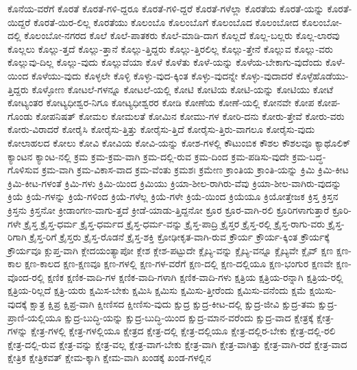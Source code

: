 {ಕೊನೆಯ-ವರೆಗೆ
ಕೊರತೆ
ಕೊರತೆ-ಗಳಿ-ದ್ದರೂ
ಕೊರತೆ-ಗಳಿ-ದ್ದರೆ
ಕೊರತೆ-ಗಳೆಲ್ಲಾ
ಕೊರತೆಯ
ಕೊರತೆ-ಯನ್ನು
ಕೊರತೆ-ಯಿದ್ದರೆ
ಕೊರತೆ-ಯಿರ-ಲಿಲ್ಲ
ಕೊರತೆಯು
ಕೊಲಂಬೊ
ಕೊಲಂಬೊಗೆ
ಕೊಲಂಬೊದ
ಕೊಲಂಬೋದ
ಕೊಲಂಬೋ-ದಲ್ಲಿ
ಕೊಲಂಬೋ-ನಗರದ
ಕೊಲೆ
ಕೊಲೆ-ಪಾತಕರು
ಕೊಲೆ-ಮಾಡಿ-ದಾಗ
ಕೊಲ್ಲದೆ
ಕೊಲ್ಲ-ಬಲ್ಲರು
ಕೊಲ್ಲ-ಲಾರವು
ಕೊಲ್ಲಲು
ಕೊಲ್ಲು-ತ್ತದೆ
ಕೊಲ್ಲು-ತ್ತಾನೆ
ಕೊಲ್ಲು-ತ್ತಿದ್ದರು
ಕೊಲ್ಲು-ತ್ತಿರಲಿಲ್ಲ
ಕೊಲ್ಲು-ತ್ತೇನೆ
ಕೊಲ್ಲುವ
ಕೊಲ್ಲು-ವರು
ಕೊಲ್ಲುವು-ದಿಲ್ಲ
ಕೊಲ್ಲು-ವುದು
ಕೊಲ್ಲುವೆಯಾ
ಕೊಳೆ
ಕೊಳೆತು
ಕೊಳೆ-ಯನ್ನು
ಕೊಳೆಯ-ಬೇಕಾಗು-ವುದೆಂದು
ಕೊಳೆ-ಯಿಂದ
ಕೊಳೆಯು-ವುದು
ಕೊಳ್ಳಲೇ
ಕೊಳ್ಳಿ
ಕೊಳ್ಳು-ವುದ-ಕ್ಕಿಂತ
ಕೊಳ್ಳು-ವುದನ್ನೇ
ಕೊಳ್ಳು-ವುದಾದರೆ
ಕೊಳ್ಳೆಹೊಡೆಯು-ತ್ತಿದ್ದರು
ಕೊಳ್ಳೋಣ
ಕೋಟಲೆ-ಗಳನ್ನೂ
ಕೋಟಲೆ-ಯಲ್ಲಿ
ಕೋಟಿ
ಕೋಟಿಯ
ಕೋಟಿ-ಯನ್ನು
ಕೋಟಿಯು
ಕೋಟೆ
ಕೋಟ್ಯಂತರ
ಕೋಟ್ಯಧೀಶ್ವರ-ನಿಗೂ
ಕೋಟ್ಯಧೀಶ್ವರರ
ಕೋಡಿ
ಕೋಣೆಯ
ಕೋಣೆ-ಯಲ್ಲಿ
ಕೋನವೇ
ಕೋಪ
ಕೋಪ-ಗೊಂಡು
ಕೋಪನಿಷತ್
ಕೋಮಲ
ಕೋಮಲತೆ
ಕೋಮಿನ
ಕೋಮು-ಗಳ
ಕೋರಿ-ದನು
ಕೋರು-ತ್ತೇವೆ
ಕೋರು-ವರು
ಕೋರು-ವಿರಾದರೆ
ಕೋರೈಸಿ
ಕೋರೈಸು-ತ್ತಿತ್ತು
ಕೋರೈಸು-ತ್ತಿದೆ
ಕೋರೈಸು-ತ್ತಿರು-ವಾಗಲೂ
ಕೋರೈಸು-ವುದು
ಕೋಲಾಹಲದ
ಕೋಲು
ಕೋವಿ
ಕೋವಿಯ
ಕೋವಿ-ಯನ್ನು
ಕೋಶ-ಗಳಲ್ಲಿ
ಕೌಟುಂಬಿಕ
ಕೌಶಲ
ಕೌಶಲವೂ
ಕ್ಯಾಥೊಲಿಕ್
ಕ್ಯಾಂಟನ
ಕ್ಯಾಂಟ-ನಲ್ಲಿ
ಕ್ರಮ
ಕ್ರಮ-ಕ್ರಮ-ವಾಗಿ
ಕ್ರಮ-ದಲ್ಲಿ-ರುವ
ಕ್ರಮ-ದಿಂದ
ಕ್ರಮ-ಪಡಿಸು-ವುದೇ
ಕ್ರಮ-ಬದ್ಧ-ಗೊಳಿಸುವ
ಕ್ರಮ-ವಾಗಿ
ಕ್ರಮ-ವಿಕಾಸ-ವಾದ
ಕ್ರಮ-ವೆಂತು
ಕ್ರಮಶಃ
ಕ್ರಮೇಣ
ಕ್ರಾಂತಿಯ
ಕ್ರಾಂತಿ-ಯನ್ನು
ಕ್ರಿಮಿ
ಕ್ರಿಮಿ-ಕೀಟ
ಕ್ರಿಮಿ-ಕೀಟ-ಗಳಂತೆ
ಕ್ರಿಮಿ-ಗಳು
ಕ್ರಿಮಿ-ಯಿಂದ
ಕ್ರಿಮಿಯು
ಕ್ರಿಯಾ-ಶೀಲ-ರಾಗಿರು-ವೆವು
ಕ್ರಿಯಾ-ಶೀಲ-ವಾಗಿರು-ವುದನ್ನು
ಕ್ರಿಯೆ
ಕ್ರಿಯೆ-ಗಳನ್ನು
ಕ್ರಿಯೆ-ಗಳಿಂದ
ಕ್ರಿಯೆ-ಗಳೆಲ್ಲ
ಕ್ರಿಯೆ-ಗಳೇ
ಕ್ರಿಯೆ-ಯಿಂದ
ಕ್ರಿಯೆಯೂ
ಕ್ರಿಯೋತ್ತೇಜಕ
ಕ್ರಿಸ್ತ
ಕ್ರಿಸ್ತನ
ಕ್ರಿಸ್ತನು
ಕ್ರಿಸ್ತನೋ
ಕ್ರೀಡಾಂಗಣ-ವಾಗು-ತ್ತದೆ
ಕ್ರೀಡೆ-ಯಾಡು-ತ್ತಿದ್ದನೋ
ಕ್ರೂರ
ಕ್ರೂರ-ವಾಗಿ-ರಲಿ
ಕ್ರೂರಿಗಳಾಗುತ್ತಾರೆ
ಕ್ರೂರಿ-ಗಳೇ
ಕ್ರೈಸ್ತ
ಕ್ರೈಸ್ತ-ಧರ್ಮ
ಕ್ರೈಸ್ತ-ಧರ್ಮದ
ಕ್ರೈಸ್ತ-ಧರ್ಮ-ವನ್ನು
ಕ್ರೈಸ್ತ-ಪಾದ್ರಿ
ಕ್ರೈಸ್ತರ
ಕ್ರೈಸ್ತ-ರಲ್ಲಿ
ಕ್ರೈಸ್ತ-ರಾಗು-ವರು
ಕ್ರೈಸ್ತ-ರಿಗಾಗಿ
ಕ್ರೈಸ್ತ-ರಿಗೆ
ಕ್ರೈಸ್ತರು
ಕ್ರೈಸ್ತ-ರೊಡನೆ
ಕ್ರೈಸ್ತ-ಶಕ್ತಿ
ಕ್ರೋಢೀಕೃತ-ವಾಗಿ-ರುವ
ಕ್ರೌರ್ಯ
ಕ್ರೌರ್ಯ-ಕ್ಕಿಂತ
ಕ್ರೌರ್ಯಕ್ಕೆ
ಕ್ರೌರ್ಯವೂ
ಕ್ಲುಪ್ತ-ವಾಗಿ
ಕ್ಲೇದಯಂತ್ಯಾಪೋ
ಕ್ಲೇಶ
ಕ್ಲೇಶ-ಪಟ್ಟುದೇ
ಕ್ಲೈಬ್ಯ-ವನ್ನು
ಕ್ಲೈಬ್ಯ-ವನ್ನೂ
ಕ್ಲೈಬ್ಯವೇ
ಕ್ಲೈವ್
ಕ್ಷಣ
ಕ್ಷಣ-ಕಾಲ
ಕ್ಷಣ-ಕಾಲದ
ಕ್ಷಣ-ಕ್ಷಣವೂ
ಕ್ಷಣ-ಗಳಲ್ಲಿ
ಕ್ಷಣ-ಗಳ-ವರೆಗೆ
ಕ್ಷಣ-ದಲ್ಲಿ
ಕ್ಷಣ-ದಲ್ಲಿಯೂ
ಕ್ಷಣ-ಭಂಗುರ
ಕ್ಷಣವೇ
ಕ್ಷಣ-ವೊಂದ-ರಲ್ಲಿ
ಕ್ಷಣಿಕ
ಕ್ಷಣಿಕ-ವಾದಿ-ಗಳ
ಕ್ಷಣಿಕ-ವಾದಿ-ಗಳಾಗಿ
ಕ್ಷಣಿಕ-ವಾದಿ-ಗಳು
ಕ್ಷತ್ರಿಯ
ಕ್ಷತ್ರಿಯ-ರನ್ನಾಗಿ
ಕ್ಷತ್ರಿಯ-ರಲ್ಲಿ
ಕ್ಷತ್ರಿಯ-ರಿಲ್ಲದೆ
ಕ್ಷತ್ರಿ-ಯರು
ಕ್ಷಮಿಸ-ಬೇಕು
ಕ್ಷಮಿಸಿ
ಕ್ಷಮಿಸು
ಕ್ಷಮಿಸು-ತ್ತೀರೆಂದು
ಕ್ಷಮಿಸು-ವನೆಂದು
ಕ್ಷಮೆ
ಕ್ಷಯಿಸು-ವುದಕ್ಕೆ
ಕ್ಷಾತ್ರ
ಕ್ಷಿಪ್ರ
ಕ್ಷಿಪ್ರ-ವಾಗಿ
ಕ್ಷೀಣಿಸದ
ಕ್ಷೀಣಿಸು-ವುದು
ಕ್ಷುದ್ರ
ಕ್ಷುದ್ರ-ಕೀಟ-ದಲ್ಲಿ
ಕ್ಷುದ್ರ-ಜೀವಿ
ಕ್ಷುದ್ರ-ತಮ
ಕ್ಷುದ್ರ-ಪ್ರಾಣಿ-ಯಲ್ಲಿಯೂ
ಕ್ಷುದ್ರ-ಬುದ್ಧಿ-ಯನ್ನು
ಕ್ಷುದ್ರ-ಬುದ್ಧಿ-ಯಿಂದ
ಕ್ಷುದ್ರ-ಮಾನ-ವರೆಂದು
ಕ್ಷುದ್ರ-ವಾದ
ಕ್ಷೇತ್ರಕ್ಕೆ
ಕ್ಷೇತ್ರ-ಗಳನ್ನು
ಕ್ಷೇತ್ರ-ಗಳಲ್ಲಿ
ಕ್ಷೇತ್ರ-ಗಳಲ್ಲಿಯೂ
ಕ್ಷೇತ್ರದ
ಕ್ಷೇತ್ರ-ದಲ್ಲಿ
ಕ್ಷೇತ್ರ-ದಲ್ಲಿಯೂ
ಕ್ಷೇತ್ರ-ದಲ್ಲಿರ-ಬೇಕು
ಕ್ಷೇತ್ರ-ದಲ್ಲಿ-ರಲಿ
ಕ್ಷೇತ್ರ-ದಲ್ಲಿ-ರುವ
ಕ್ಷೇತ್ರ-ವನ್ನು
ಕ್ಷೇತ್ರ-ವಲ್ಲ
ಕ್ಷೇತ್ರ-ವಾಗ-ಬೇಕು
ಕ್ಷೇತ್ರ-ವಾಗಿ
ಕ್ಷೇತ್ರ-ವಾಗಿತ್ತು
ಕ್ಷೇತ್ರ-ವಾಗಿ-ರದೆ
ಕ್ಷೇತ್ರ-ವಾದ
ಕ್ಷೇತ್ರಿಕ
ಕ್ಷೇತ್ರಿಕವತ್
ಕ್ಷೇಮ-ಕ್ಕಾಗಿ
ಕ್ಷೇಮ-ವಾಗಿ
ಖಂಡಕ್ಕೆ
ಖಂಡ-ಗಳಲ್ಲಿನ
}
